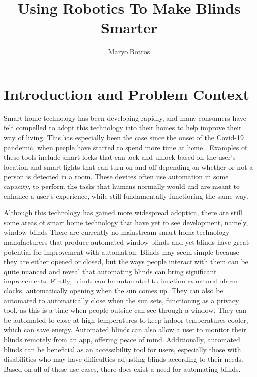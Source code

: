 \documentclass[10pt,twocolumn]{article}
\title{Using Robotics To Make Blinds Smarter}
\author{Maryo Botros}
\affiliation{Occidental College}
\begin{document}
\maketitle

\section{Introduction and Problem Context}

Smart home technology has been developing rapidly, and many consumers have felt compelled to adopt this technology into their homes to help improve their way of living. This has especially been the case since the onset of the Covid-19 pandemic, when people have started to spend more time at home \cite{Ghosh2021SmartHomeDevice}. Examples of these tools include smart locks that can lock and unlock based on the user's location and smart lights that can turn on and off depending on whether or not a person is detected in a room. These devices often use automation in some capacity, to perform the tasks that humans normally would and are meant to enhance a user’s experience, while still fundamentally functioning the same way.

Although this technology has gained more widespread adoption, there are still some areas of smart home technology that have yet to see development, namely, window blinds There are currently no mainstream smart home technology manufacturers that produce automated window blinds and yet blinds have great potential for improvement with automation. Blinds may seem simple because they are either opened or closed, but the ways people interact with them can be quite nuanced and reveal that automating blinds can bring significant improvements. Firstly, blinds can be automated to function as natural alarm clocks, automatically opening when the sun comes up. They can also be automated to automatically close when the sun sets, functioning as a privacy tool, as this is a time when people outside can see through a window. They can be automated to close at high temperatures to keep indoor temperatures cooler, which can save energy. Automated blinds can also allow a user to monitor their blinds remotely from an app, offering peace of mind. Additionally, automated blinds can be beneficial as an accessibility tool for users, especially those with disabilities who may have difficulties adjusting blinds according to their needs. Based on all of these use cases, there does exist a need for automating blinds.
\end{document}
